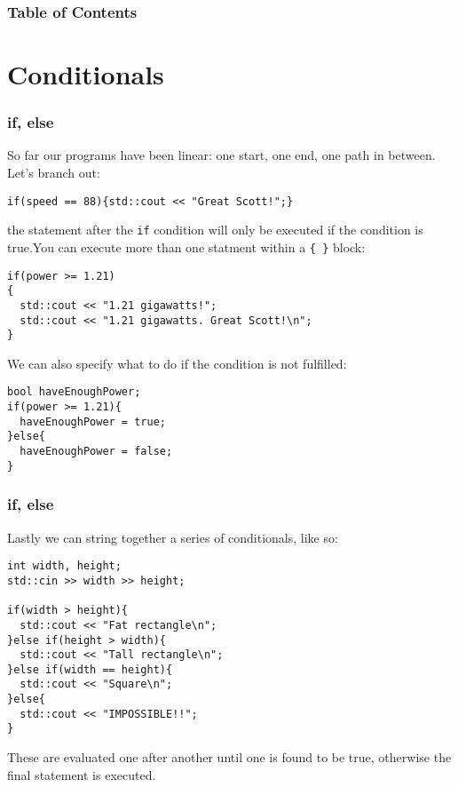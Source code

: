 \documentclass{beamer}
\subtitle{Session 1: Control structure}
\begin{document}
\frame{\titlepage}

\begin{frame}
\frametitle{Table of Contents}
\tableofcontents
\end{frame}

\section{Conditionals}

\begin{frame}[fragile]
	\frametitle{if, else}
	So far our programs have been linear: one start, one end, one path in between.  Let's branch out:
	\pause
	\begin{lstlisting}
if(speed == 88){std::cout << "Great Scott!";}
	\end{lstlisting}
	the statement after the \texttt{if} condition will only be executed if the condition is true.\pause  You can execute more than one statment within a \texttt{\{ \}} block:
	\begin{lstlisting}
if(power >= 1.21)
{
  std::cout << "1.21 gigawatts!";
  std::cout << "1.21 gigawatts. Great Scott!\n";
}
	\end{lstlisting} 
	\pause
	We can also specify what to do if the condition is not fulfilled:
	\begin{lstlisting}
bool haveEnoughPower;
if(power >= 1.21){
  haveEnoughPower = true;
}else{
  haveEnoughPower = false;
}
	\end{lstlisting}
\end{frame}



\begin{frame}[fragile]
  \frametitle{if, else}
  Lastly we can string together a series of conditionals, like so:
	\begin{lstlisting}
int width, height;
std::cin >> width >> height;
	
if(width > height){
  std::cout << "Fat rectangle\n";
}else if(height > width){
  std::cout << "Tall rectangle\n";
}else if(width == height){
  std::cout << "Square\n";
}else{
  std::cout << "IMPOSSIBLE!!";
}
	\end{lstlisting}
	These are evaluated one after another until one is found to be true, otherwise the final  statement is executed.
	\pause
\end{frame}
\end{document}
